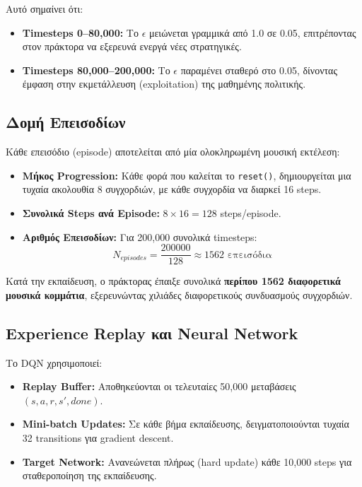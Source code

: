 \documentclass[11pt, a4paper]{article}
\begin{document}
Αυτό σημαίνει ότι:
\begin{itemize}
    \item \textbf{Timesteps 0--80,000:} Το $\epsilon$ μειώνεται γραμμικά από 1.0 σε 0.05, επιτρέποντας στον πράκτορα να εξερευνά ενεργά νέες στρατηγικές.
    \item \textbf{Timesteps 80,000--200,000:} Το $\epsilon$ παραμένει σταθερό στο 0.05, δίνοντας έμφαση στην εκμετάλλευση (exploitation) της μαθημένης πολιτικής.
\end{itemize}

\subsection{Δομή Επεισοδίων}
Κάθε επεισόδιο (episode) αποτελείται από μία ολοκληρωμένη μουσική εκτέλεση:
\begin{itemize}
    \item \textbf{Μήκος Progression:} Κάθε φορά που καλείται το \texttt{reset()}, δημιουργείται μια τυχαία ακολουθία 8 συγχορδιών, με κάθε συγχορδία να διαρκεί 16 steps.
    \item \textbf{Συνολικά Steps ανά Episode:} $8 \times 16 = 128$ steps/episode.
    \item \textbf{Αριθμός Επεισοδίων:} Για 200,000 συνολικά timesteps: 
    \begin{equation}
    N_{episodes} = \frac{200000}{128} \approx 1562 \text{ επεισόδια}
    \end{equation}
\end{itemize}

Κατά την εκπαίδευση, ο πράκτορας έπαιξε συνολικά \textbf{περίπου 1562 διαφορετικά μουσικά κομμάτια}, εξερευνώντας χιλιάδες διαφορετικούς συνδυασμούς συγχορδιών.

\subsection{Experience Replay και Neural Network}
Το DQN χρησιμοποιεί:
\begin{itemize}
    \item \textbf{Replay Buffer:} Αποθηκεύονται οι τελευταίες 50,000 μεταβάσεις $(s, a, r, s', done)$.
    \item \textbf{Mini-batch Updates:} Σε κάθε βήμα εκπαίδευσης, δειγματοποιούνται τυχαία 32 transitions για gradient descent.
    \item \textbf{Target Network:} Ανανεώνεται πλήρως (hard update) κάθε 10,000 steps για σταθεροποίηση της εκπαίδευσης.
\end{itemize}
\end{document}
